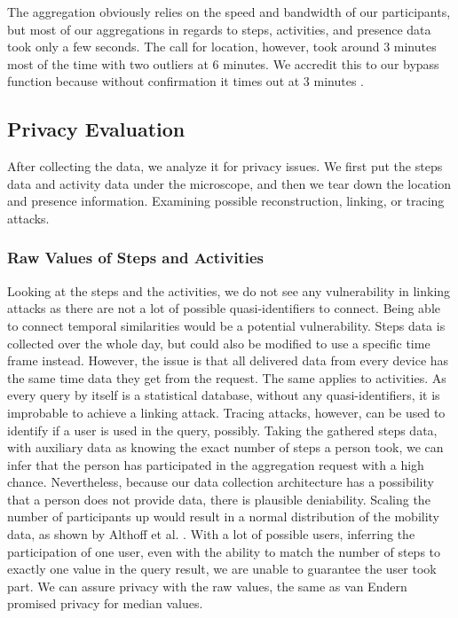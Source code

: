 The aggregation obviously relies on the speed and bandwidth of our participants, but most of our aggregations in regards to steps, activities, and presence data took only a few seconds. The call for location, however, took around 3 minutes most of the time with two outliers at 6 minutes. We accredit this to our bypass function because without confirmation it times out at 3 minutes .

\subsection{Privacy Evaluation}
After collecting the data, we analyze it for privacy issues. We first put the steps data and activity data under the microscope, and then we tear down the location and presence information. Examining possible reconstruction, linking, or tracing attacks.

\subsubsection{Raw Values of Steps and Activities}
Looking at the steps and the activities, we do not see any vulnerability in linking attacks as there are not a lot of possible quasi-identifiers to connect. Being able to connect temporal similarities would be a potential vulnerability. Steps data is collected over the whole day, but could also be modified to use a specific time frame instead. However, the issue is that all delivered data from every device has the same time data they get from the request. The same applies to activities. As every query by itself is a statistical database, without any quasi-identifiers, it is improbable to achieve a linking attack. 
Tracing attacks, however, can be used to identify if a user is used in the query, possibly. Taking the gathered steps data, with auxiliary data as knowing the exact number of steps a person took, we can infer that the person has participated in the aggregation request with a high chance. Nevertheless, because our data collection architecture has a possibility that a person does not provide data, there is plausible deniability. Scaling the number of participants up would result in a normal distribution of the mobility data, as shown by Althoff et al. \cite{inequality}. With a lot of possible users, inferring the participation of one user, even with the ability to match the number of steps to exactly one value in the query result, we are unable to guarantee the user took part. We can assure privacy with the raw values, the same as van Endern promised privacy for median values.

